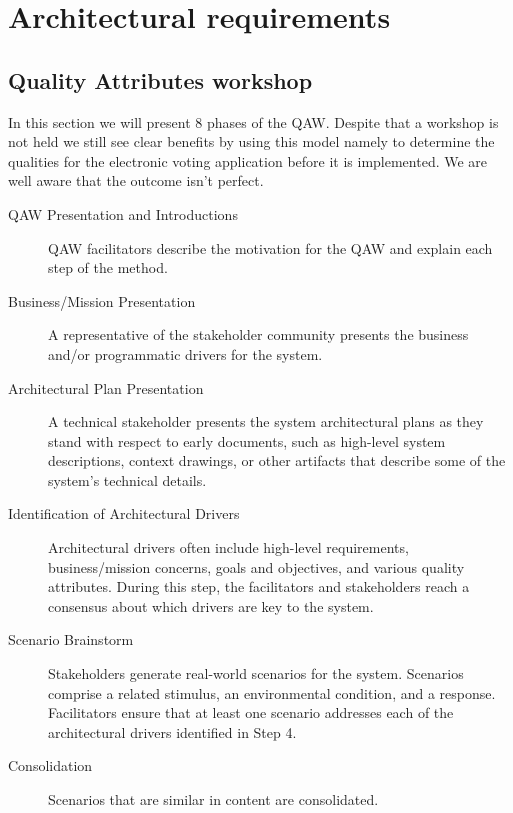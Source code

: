 \section{Architectural requirements}






\subsection{Quality Attributes workshop}
In this section we will present 8 phases of the QAW. Despite that a workshop is not held we still see clear benefits by using this model namely to determine the qualities for the electronic voting application before it is implemented. We are well aware that the outcome isn't perfect. 
\begin{description}
    \item [QAW Presentation and Introductions]
        QAW facilitators describe the motivation for the QAW and explain each step of the method. 
    
    \item [Business/Mission Presentation]    
        A representative of the stakeholder community presents the business and/or programmatic drivers for the system.
    
    \item [Architectural Plan Presentation]
        A technical stakeholder presents the system architectural plans as they stand with respect to early documents, such as high-level system descriptions, context drawings, or other artifacts that describe some of the system's technical details.
    
    \item [Identification of Architectural Drivers]
     Architectural drivers often include high-level requirements, business/mission concerns, goals and objectives, and various quality attributes. During this step, the facilitators and stakeholders reach a consensus about which drivers are key to the system.
          
    
    \item [Scenario Brainstorm]
        Stakeholders generate real-world scenarios for the system. Scenarios comprise a related stimulus, an environmental condition, and a response. Facilitators ensure that at least one scenario addresses each of the architectural drivers identified in Step 4.
         
    \item [Consolidation] 
        Scenarios that are similar in content are consolidated.
    

\end{description}

